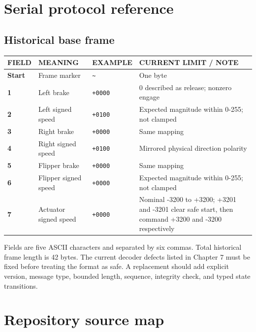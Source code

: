 \documentclass[10pt,openany]{book}
\begin{document}
\chapter{Serial protocol reference}

\section*{Historical base frame}

\begin{tabularx}{\textwidth}{>{\robcondensed\bfseries}p{0.65in} p{1.55in} p{1.1in} X}
\toprule
FIELD & MEANING & EXAMPLE & CURRENT LIMIT / NOTE\\
\midrule
Start & Frame marker & \texttt{\textasciitilde} & One byte\\
1 & Left brake & \texttt{+0000} & 0 described as release; nonzero engage\\
2 & Left signed speed & \texttt{+0100} & Expected magnitude within 0-255; not clamped\\
3 & Right brake & \texttt{+0000} & Same mapping\\
4 & Right signed speed & \texttt{+0100} & Mirrored physical direction polarity\\
5 & Flipper brake & \texttt{+0000} & Same mapping\\
6 & Flipper signed speed & \texttt{+0000} & Expected magnitude within 0-255; not clamped\\
7 & Actuator signed speed & \texttt{+0000} & Nominal -3200 to +3200; +3201 and -3201 clear safe start, then command +3200 and -3200 respectively\\
\bottomrule
\end{tabularx}

Fields are five ASCII characters and separated by six commas. Total historical frame length is 42 bytes. The current decoder defects listed in Chapter 7 must be fixed before treating the format as safe. A replacement should add explicit version, message type, bounded length, sequence, integrity check, and typed state transitions.

\chapter{Repository source map}
\end{document}
